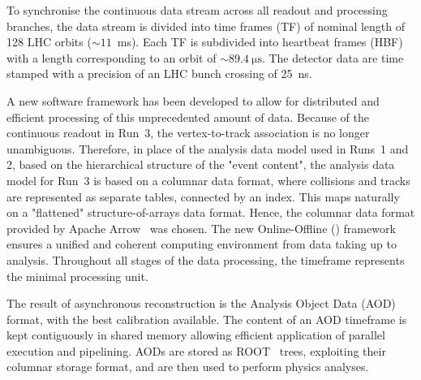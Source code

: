 To synchronise the continuous data stream across all readout and processing branches, the data stream is divided into time frames (TF) of nominal length of 128 LHC orbits ($\sim11$~ms). Each TF is subdivided into heartbeat frames (HBF) with a length corresponding to an orbit of $\sim\SI{89.4}{\micro\second}$. The detector data are time stamped with a precision of an LHC bunch crossing of 25~ns. 

A new software framework has been developed to allow for distributed and efficient processing of this unprecedented amount of data. Because of the continuous readout in Run~3, the vertex-to-track association is no longer unambiguous. Therefore, in place of the analysis data model used in Runs~1 and 2, based on the hierarchical structure of the "event content", the analysis data model for Run~3 is based on a columnar data format, where collisions and tracks are represented as separate tables, connected by an index. This maps naturally on a "flattened" structure-of-arrays data format. Hence, the columnar data format provided by Apache Arrow~\cite{ApacheArrow} was chosen. The new Online-Offline (\osq) framework ensures a unified and coherent computing environment from data taking up to analysis. Throughout all stages of the data processing, the timeframe represents the minimal processing unit. 

The result of asynchronous reconstruction is the Analysis Object Data (AOD) format, with the best calibration available. The content of an AOD timeframe is kept contiguously in shared memory allowing efficient application of parallel execution and pipelining. AODs are stored as ROOT~\cite{Brun:1997pa} trees, exploiting their columnar storage format, and are then used to perform physics analyses. 

